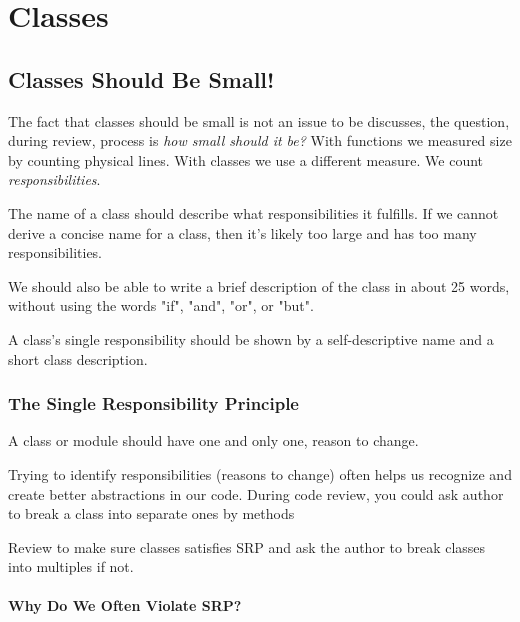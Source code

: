 
\chapter{Classes}

\section{Classes Should Be Small!}

The fact that classes should be small is not an issue to be discusses, the question, during review, process is \textit{how small should it be?} With functions we measured size by counting physical lines. With classes we use a different measure. We count \textit{responsibilities}.

The name of a class should describe what responsibilities it fulfills. If we cannot derive a concise name for a class, then it's likely too large and has too many responsibilities.

We should also be able to write a brief description of the class in about 25 words,
without using the words "if", "and", "or", or "but".

\begin{marker}
A class's single responsibility should be shown by a self-descriptive name and a short class description.
\end{marker}

\subsection{The Single Responsibility Principle}

\begin{definition}
A class or module should have one and only one, reason to change.
\end{definition}

Trying to identify responsibilities (reasons to change) often helps us recognize and
create better abstractions in our code. During code review, you could ask author to break a class into separate ones by methods

\begin{marker}
Review to make sure classes satisfies SRP and ask the author to break classes into multiples if not.
\end{marker}

\subsubsection{Why Do We Often Violate SRP?}

